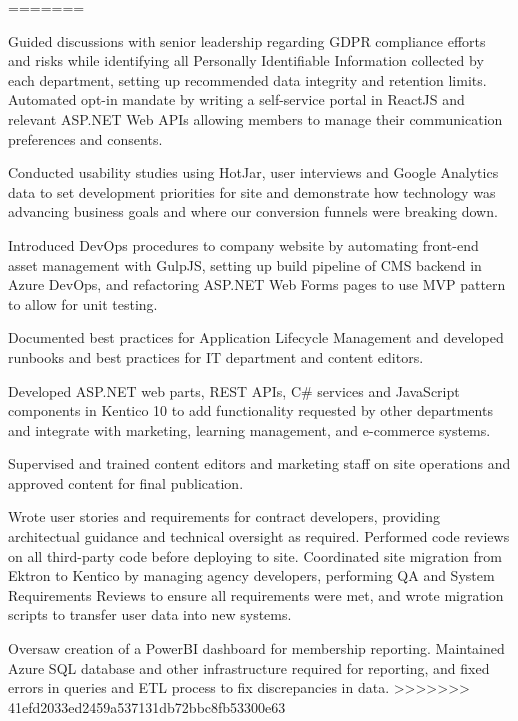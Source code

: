 \begin{cventries}
{\begin{cvitems}
=======
        \item {Guided discussions with senior leadership regarding GDPR compliance efforts and risks while identifying all Personally Identifiable Information collected by each department, setting up recommended data integrity and retention limits. Automated opt-in mandate by writing a self-service portal in ReactJS and relevant ASP.NET Web APIs allowing members to manage their communication preferences and consents.}
        \item {Conducted usability studies using HotJar, user interviews and Google Analytics data to set development priorities for site and demonstrate how technology was advancing business goals and where our conversion funnels were breaking down.}
        \item {Introduced DevOps procedures to company website by automating front-end asset management with GulpJS, setting up build pipeline of CMS backend in Azure DevOps, and refactoring ASP.NET Web Forms pages to use MVP pattern to allow for unit testing.}
         \item {Documented best practices for Application Lifecycle Management and developed runbooks and best practices for IT department and content editors.}
         \item {Developed ASP.NET web parts, REST APIs, C# services and JavaScript components in Kentico 10 to add functionality requested by other departments and integrate with marketing, learning management, and e-commerce systems.}
        \item {Supervised and trained content editors and marketing staff on site operations and approved content for final publication.}
        \item {Wrote user stories and requirements for contract developers, providing architectual guidance and technical oversight as required. Performed code reviews on all third-party code before deploying to site. Coordinated site migration from Ektron to Kentico by managing agency developers, performing QA and System Requirements Reviews to ensure all requirements were met, and wrote migration scripts to transfer user data into new systems.}
        \item {Oversaw creation of a PowerBI dashboard for membership reporting. Maintained Azure SQL database and other infrastructure required for reporting, and fixed errors in queries and ETL process to fix discrepancies in data.}
>>>>>>> 41efd2033ed2459a537131db72bbc8fb53300e63
      \end{cvitems}
    }


\end{cventries}
